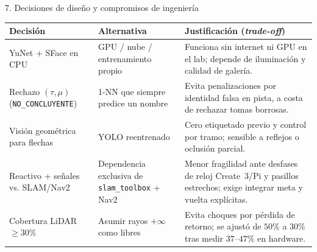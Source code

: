 \documentclass[aspectratio=169,10pt]{beamer}
\begin{document}
\begin{frame}{7. Decisiones de diseño y compromisos de ingeniería}
  \footnotesize
  \begin{tabularx}{\textwidth}{@{}P{3.2cm}P{3.6cm}Y@{}}
    \hline
    \textbf{Decisión} & \textbf{Alternativa} & \textbf{Justificación (\textit{trade-off})}\\
    \hline
    YuNet + SFace en CPU &
    GPU / nube / entrenamiento propio &
    Funciona sin internet ni GPU en el lab; depende de iluminación y calidad de galería.\\
    Rechazo $(\tau,\mu)$ (\texttt{NO\_CONCLUYENTE}) &
    1-NN que siempre predice un nombre &
    Evita penalizaciones por identidad falsa en pista, a costa de rechazar tomas borrosas.\\
    Visión geométrica para flechas &
    YOLO reentrenado &
    Cero etiquetado previo y control por tramo; sensible a reflejos o oclusión parcial.\\
    Reactivo + señales vs. SLAM/Nav2 &
    Dependencia exclusiva de \texttt{slam\_toolbox} + Nav2 &
    Menor fragilidad ante desfases de reloj Create~3/Pi y pasillos estrechos; exige integrar meta y vuelta explícitas.\\
    Cobertura LiDAR $\ge 30\%$ &
    Asumir rayos $+\infty$ como libres &
    Evita choques por pérdida de retorno; se ajustó de $50\%$ a $30\%$ tras medir $37$--$47\%$ en hardware.\\
    \hline
  \end{tabularx}
\end{frame}
\end{document}
